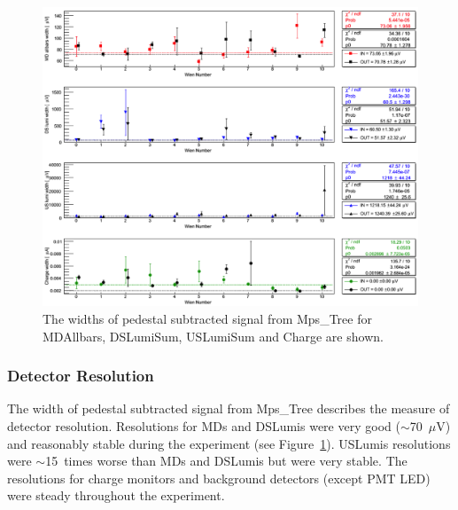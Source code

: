 \begin{singlespace}
\begin{figure}[!h]
	\centering
	\includegraphics[width=15.0cm]{figures/pedestalSumWidth}
	\caption
	{The widths of pedestal subtracted signal from Mps\_Tree for MDAllbars, DSLumiSum, USLumiSum and Charge are shown.}
	\label{fig:pedestalSumWidth}
\end{figure}
\end{singlespace}

\subsubsection{Detector Resolution}
\label{Detector Resolution}

The width of pedestal subtracted signal from Mps\_Tree describes the measure of detector resolution. Resolutions for MDs and DSLumis were very good ($\sim$70~$\mu$V) and reasonably stable during the experiment (see Figure~\ref{fig:pedestalSumWidth}). USLumis resolutions were $\sim$15~times worse than MDs and DSLumis but were very stable. The resolutions for charge monitors and background detectors (except PMT LED) were steady throughout the experiment. 


